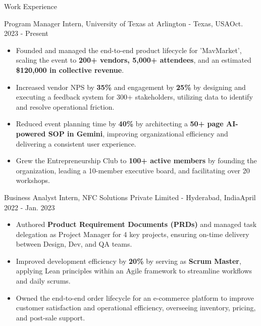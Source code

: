 \documentclass{resume} %
\begin{document}
\begin{rSection}{Work Experience}

\begin{rSubsection}
{Program Manager Intern, University of Texas at Arlington - Texas, USA}{Oct. 2023 - Present}{}{}
\begin{itemize}[left=-1.5em, labelsep=.1cm, labelwidth=.2cm, itemsep=0.0em]
\item Founded and managed the end-to-end product lifecycle for 'MavMarket', scaling the event to \textbf{200+ vendors, 5,000+ attendees}, and an estimated \textbf{\$120,000 in collective revenue}.
\item Increased vendor NPS by \textbf{35\%} and engagement by \textbf{25\%} by designing and executing a feedback system for 300+ stakeholders, utilizing data to identify and resolve operational friction.
\item Reduced event planning time by \textbf{40\%} by architecting a \textbf{50+ page AI-powered SOP in Gemini}, improving organizational efficiency and delivering a consistent user experience.
\item Grew the Entrepreneurship Club to \textbf{100+ active members} by founding the organization, leading a 10-member executive board, and facilitating over 20 workshops.
\end{itemize}
\end{rSubsection}

\begin{rSubsection}
{Business Analyst Intern, NFC Solutions Private Limited - Hyderabad, India}{April 2022 - Jan. 2023}{}{}
\begin{itemize}[left=-1.5em, labelsep=.1cm, labelwidth=.2cm, itemsep=0.0em]
\item Authored \textbf{Product Requirement Documents (PRDs)} and managed task delegation as Project Manager for 4 key projects, ensuring on-time delivery between Design, Dev, and QA teams.
\item Improved development efficiency by \textbf{20\%} by serving as \textbf{Scrum Master}, applying Lean principles within an Agile framework to streamline workflows and daily scrums.
\item Owned the end-to-end order lifecycle for an e-commerce platform to improve customer satisfaction and operational efficiency, overseeing inventory, pricing, and post-sale support.
\end{itemize}
\end{rSubsection}


\end{rSection}
\end{document}
